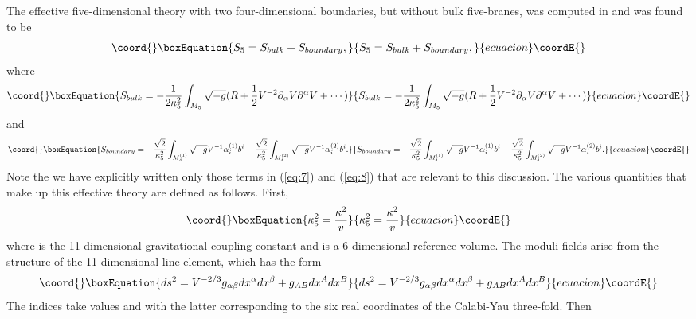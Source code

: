 \documentclass[a4paper,12pt]{article}
\numberwithin{equation}{section}
\theoremstyle{plain}
\begin{document}
The effective five-dimensional theory with two four-dimensional
boundaries, but without bulk five-branes, was computed in \cite{BW1B} 
and was found to be
%
\begin{equation}\coord{}\boxEquation{
S_{5}=S_{bulk}+S_{boundary},
\label{eq:6}
}{
S_{5}=S_{bulk}+S_{boundary},
}{ecuacion}\coordE{}\end{equation}
%
where
%
\begin{equation}\coord{}\boxEquation{
S_{bulk}=-\frac{1}{2\kappa_{5}^{2}}\int_{M_{5}}{\sqrt{-g}(R+\frac{1}{2}
V^{-2}\partial_{\alpha}V\partial^{\alpha}V+\cdots)}
\label{eq:7}
}{
S_{bulk}=-\frac{1}{2\kappa_{5}^{2}}\int_{M_{5}}{\sqrt{-g}(R+\frac{1}{2}
V^{-2}\partial_{\alpha}V\partial^{\alpha}V+\cdots)}
}{ecuacion}\coordE{}\end{equation}
%
and
%
\begin{equation}\coord{}\boxEquation{
S_{boundary}=-\frac{\sqrt{2}}{\kappa_{5}^{2}}\int_{M_{4}^{(1)}}{\sqrt{-g}V^{-1}
\alpha_{i}^{(1)}b^{i}} - \frac{\sqrt{2}}{\kappa_{5}^{2}}\int_{M_{4}^{(2)}}
{\sqrt{-g}V^{-1}\alpha_{i}^{(2)}b^{i}}.
\label{eq:8}
}{
S_{boundary}=-\frac{\sqrt{2}}{\kappa_{5}^{2}}\int_{M_{4}^{(1)}}{\sqrt{-g}V^{-1}
\alpha_{i}^{(1)}b^{i}} - \frac{\sqrt{2}}{\kappa_{5}^{2}}\int_{M_{4}^{(2)}}
{\sqrt{-g}V^{-1}\alpha_{i}^{(2)}b^{i}}.
}{ecuacion}\coordE{}\end{equation}
%
Note the we have explicitly written only those terms in (\ref{eq:7}) and
(\ref{eq:8}) that 
are relevant to this discussion. The various quantities that make up this
effective theory are defined as follows. First,
%
\begin{equation}\coord{}\boxEquation{
\kappa_{5}^{2}=\frac{\kappa^{2}}{v}
\label{eq:9}
}{
\kappa_{5}^{2}=\frac{\kappa^{2}}{v}
}{ecuacion}\coordE{}\end{equation}
%
where \myHighlight{$\kappa$}\coordHE{} is the 11-dimensional gravitational coupling constant and \coordHE{} is a
6-dimensional reference volume. The moduli fields arise from the structure of
the 11-dimensional line element, which has the form
%
\begin{equation}\coord{}\boxEquation{
ds^{2}=V^{-2/3}g_{\alpha\beta}dx^{\alpha}dx^{\beta}+g_{AB}dx^{A}dx^{B}
\label{eq:10}
}{
ds^{2}=V^{-2/3}g_{\alpha\beta}dx^{\alpha}dx^{\beta}+g_{AB}dx^{A}dx^{B}
}{ecuacion}\coordE{}\end{equation}
%
The indices take values \coordHE{} and \coordHE{} 
with the
latter corresponding to the six real 
coordinates of the Calabi-Yau three-fold. Then
\end{document}
